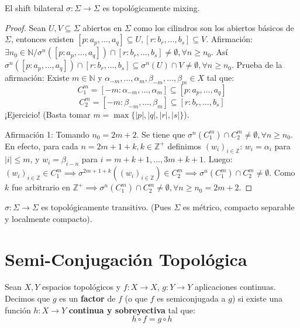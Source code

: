 \begin{proposicion}
	El shift bilateral $\sigma: \Sigma \to \Sigma$ es topológicamente mixing.
\end{proposicion}
\begin{proof}
	Sean $U, V \subseteq \Sigma$ abiertos en $\Sigma$ como los cilindros son los abiertos básicos de $\Sigma$, entonces existen $[p: a_p, \dots, a_q] \subseteq U, [r: b_r, \dots, b_s] \subseteq V$.
	Afirmación: $\exists n_0 \in \mathbb{N} / \sigma^n([p: a_p, \dots, a_q]) \cap [r: b_r, \dots, b_s] \neq \emptyset, \forall n \ge n_0$. Así $\sigma^n([p: a_p, \dots, a_q]) \cap [r: b_r, \dots, b_s] \subseteq \sigma^n(U) \cap V \neq \emptyset, \forall n \ge n_0$.
	Prueba de la afirmación: Existe $m \in \mathbb{N}$ y $\alpha_{-m}, \dots, \alpha_m, \beta_{-m}, \dots, \beta_m \in X$ tal que:
	$$ C_1^m = [-m: \alpha_{-m}, \dots, \alpha_m] \subseteq [p: a_p, \dots, a_q] $$
	$$ C_2^m = [-m: \beta_{-m}, \dots, \beta_m] \subseteq [r: b_r, \dots, b_s] $$
	¡Ejercicio! (Basta tomar $m = \max\{|p|, |q|, |r|, |s|\}$).
	
	Afirmación 1: Tomando $n_0 = 2m+2$. Se tiene que $\sigma^n(C_1^m) \cap C_2^m \neq \emptyset, \forall n \ge n_0$. En efecto, para cada $n = 2m+1+k, k \in \mathbb{Z}^+$ definimos $(w_i)_{i \in \mathbb{Z}}$:
	$w_i = \alpha_i$ para $|i| \le m$, y $w_i = \beta_{i-n}$ para $i = m+k+1, \dots, 3m+k+1$.
	Luego: $(w_i)_{i \in \mathbb{Z}} \in C_1^m \implies \sigma^{2m+1+k}((w_i)_{i \in \mathbb{Z}}) \in C_2^m \implies \sigma^n(C_1^m) \cap C_2^m \neq \emptyset$. Como $k$ fue arbitrario en $\mathbb{Z}^+ \implies \sigma^n(C_1^m) \cap C_2^m \neq \emptyset, \forall n \ge n_0 = 2m+2$.
\end{proof}

\begin{corolario}
	$\sigma: \Sigma \to \Sigma$ es topológicamente transitivo. (Pues $\Sigma$ es métrico, compacto separable y localmente compacto).
\end{corolario}

\section{Semi-Conjugación Topológica}

\begin{definicion}
	Sean $X, Y$ espacios topológicos y $f: X \to X$, $g: Y \to Y$ aplicaciones continuas. Decimos que $g$ es un \textbf{factor} de $f$ (o que $f$ es semiconjugada a $g$) si existe una función $h: X \to Y$ \textbf{continua y sobreyectiva} tal que:
	$$h \circ f = g \circ h$$
\end{definicion}


